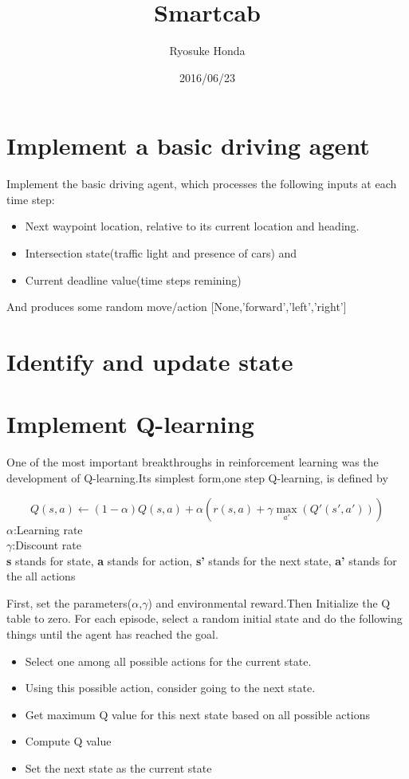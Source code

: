 \documentclass[a4paper,11pt]{article}
\begin{document}
\title{Smartcab}
\author{Ryosuke Honda}
\date{2016/06/23}

\maketitle

\section{Implement a basic driving agent}
Implement the basic driving agent, which processes the following inputs at each time step:
\begin{itemize}
\item Next waypoint location, relative to its current location and heading.
\item Intersection state(traffic light and presence of cars) and
\item Current deadline value(time steps remining)
\end{itemize}
And produces some random move/action [None,'forward','left','right']
\section{Identify and update state}

\section{Implement Q-learning}
One of the most important breakthroughs in reinforcement learning was the development of Q-learning.Its simplest form,one step Q-learning, is defined by

\begin{equation}
	Q(s,a)\leftarrow (1-\alpha)Q(s,a)+\alpha(r(s,a)+\gamma \max_{a'}(Q'(s',a')))
\end{equation}
$\alpha$:Learning rate　\\
$\gamma$:Discount rate \\
{\bf s} stands for state, {\bf a} stands for action, {\bf s'} stands for the next state, {\bf a'} stands for the all actions


First, set the parameters($\alpha$,$\gamma$) and environmental reward.Then Initialize the Q table to zero. For each episode, select a random initial state and do the following things until the agent has reached the goal.
\begin{itemize}
\item Select one among all possible actions for the current state.
\item Using this possible action, consider going to the next state.
\item Get maximum Q value for this next state based on all possible actions
\item Compute Q value
\item Set the next state as the current state
\end{itemize}
\end{document}
